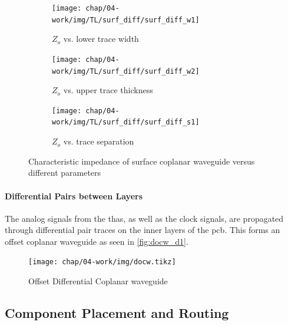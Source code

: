 \begin{figure}[tbh]
     \centering
     \begin{subfigure}[b]{\textwidth}
         \centering
         \texttt{[image: chap/04-work/img/TL/surf\_diff/surf\_diff\_w1]}
         \caption{$Z_o$ vs. lower trace width}
         \label{fig:surf_d1}
     \end{subfigure}
     
     \begin{subfigure}[b]{\textwidth}
         \centering
         \texttt{[image: chap/04-work/img/TL/surf\_diff/surf\_diff\_w2]}
         \caption{$Z_o$ vs. upper trace thickness}
         \label{fig:surf_w1}
     \end{subfigure}
     
     \begin{subfigure}[b]{\textwidth}
         \centering
         \texttt{[image: chap/04-work/img/TL/surf\_diff/surf\_diff\_s1]}
         \caption{$Z_o$ vs. trace separation }
         \label{fig:surf_w2}
     \end{subfigure}
     \caption[Characteristic impedance of surface coplanar waveguide]{Characteristic impedance of surface coplanar waveguide versus different parameters}
        \label{fig:surf}
\end{figure}



\paragraph{Differential Pairs between Layers}
The analog signals from the \glspl{tha}, as well as the clock signals, are propagated through differential pair traces on the inner layers of the \gls{pcb}. 
This forms an offset coplanar waveguide as seen in \autoref{fig:docw_d1}.

\begin{figure}[tbh]
	\centering
	\texttt{[image: chap/04-work/img/docw.tikz]}
	\caption{Offset Differential Coplanar waveguide}
	\label{fig:docw_d1}
\end{figure}


\subsection{Component Placement and Routing}


